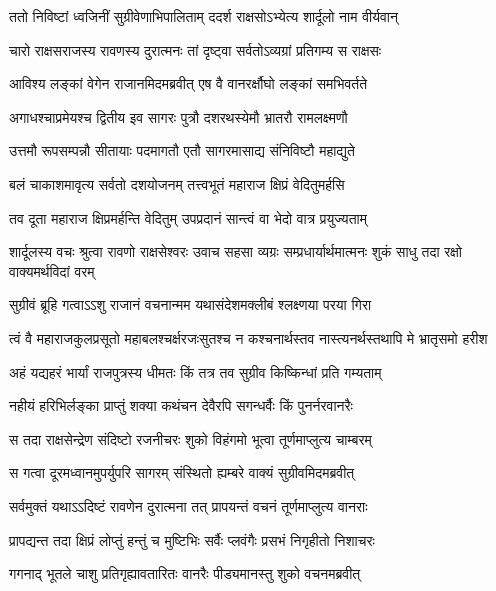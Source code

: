 
\twolineshloka
{ततो निविष्टां ध्वजिनीं सुग्रीवेणाभिपालिताम्}
{ददर्श राक्षसोऽभ्येत्य शार्दूलो नाम वीर्यवान्} %

\twolineshloka
{चारो राक्षसराजस्य रावणस्य दुरात्मनः}
{तां दृष्ट्वा सर्वतोऽव्यग्रां प्रतिगम्य स राक्षसः} %

\twolineshloka
{आविश्य लङ्कां वेगेन राजानमिदमब्रवीत्}
{एष वै वानरर्क्षौघो लङ्कां समभिवर्तते} %

\twolineshloka
{अगाधश्चाप्रमेयश्च द्वितीय इव सागरः}
{पुत्रौ दशरथस्येमौ भ्रातरौ रामलक्ष्मणौ} %

\twolineshloka
{उत्तमौ रूपसम्पन्नौ सीतायाः पदमागतौ}
{एतौ सागरमासाद्य संनिविष्टौ महाद्युते} %

\twolineshloka
{बलं चाकाशमावृत्य सर्वतो दशयोजनम्}
{तत्त्वभूतं महाराज क्षिप्रं वेदितुमर्हसि} %

\twolineshloka
{तव दूता महाराज क्षिप्रमर्हन्ति वेदितुम्}
{उपप्रदानं सान्त्वं वा भेदो वात्र प्रयुज्यताम्} %

\threelineshloka
{शार्दूलस्य वचः श्रुत्वा रावणो राक्षसेश्वरः}
{उवाच सहसा व्यग्रः सम्प्रधार्यार्थमात्मनः}
{शुकं साधु तदा रक्षो वाक्यमर्थविदां वरम्} %

\twolineshloka
{सुग्रीवं ब्रूहि गत्वाऽऽशु राजानं वचनान्मम}
{यथासंदेशमक्लीबं श्लक्ष्णया परया गिरा} %

\twolineshloka
{त्वं वै महाराजकुलप्रसूतो महाबलश्चर्क्षरजःसुतश्च}
{न कश्चनार्थस्तव नास्त्यनर्थस्तथापि मे भ्रातृसमो हरीश} %

\twolineshloka
{अहं यद्यहरं भार्यां राजपुत्रस्य धीमतः}
{किं तत्र तव सुग्रीव किष्किन्धां प्रति गम्यताम्} %

\twolineshloka
{नहीयं हरिभिर्लङ्का प्राप्तुं शक्या कथंचन}
{देवैरपि सगन्धर्वैः किं पुनर्नरवानरैः} %

\twolineshloka
{स तदा राक्षसेन्द्रेण संदिष्टो रजनीचरः}
{शुको विहंगमो भूत्वा तूर्णमाप्लुत्य चाम्बरम्} %

\twolineshloka
{स गत्वा दूरमध्वानमुपर्युपरि सागरम्}
{संस्थितो ह्यम्बरे वाक्यं सुग्रीवमिदमब्रवीत्} %

\twolineshloka
{सर्वमुक्तं यथाऽऽदिष्टं रावणेन दुरात्मना}
{तत् प्रापयन्तं वचनं तूर्णमाप्लुत्य वानराः} %

\twolineshloka
{प्रापद्यन्त तदा क्षिप्रं लोप्तुं हन्तुं च मुष्टिभिः}
{सर्वैः प्लवंगैः प्रसभं निगृहीतो निशाचरः} %

\twolineshloka
{गगनाद् भूतले चाशु प्रतिगृह्यावतारितः}
{वानरैः पीड्यमानस्तु शुको वचनमब्रवीत्} %

